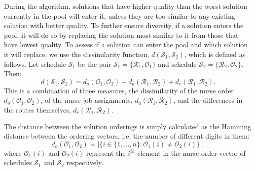 \documentclass[a4paper,11pt,authoryear]{elsarticle}
\begin{document}
During the algorithm, solutions that have higher quality than the worst solution currently in the pool will enter it, unless they are too similar to any existing solution with better quality. To further ensure diversity, if a solution enters the pool, it will do so by replacing the solution most similar to it from those that have lowest quality. To assess if a solution can enter the pool and which solution it will replace, we use the dissimilarity function, $d(\mathcal{S}_1, \mathcal{S}_2)$, which is defined as follows. Let schedule $\mathcal{S}_1$ be the pair $\mathcal{S}_1 = \{\mathcal{R}_1, \mathcal{O}_1\}$ and schedule $\mathcal{S}_2 = \{\mathcal{R}_2, \mathcal{O}_2\}$. Then:
\begin{equation}
    d(\mathcal{S}_1, \mathcal{S}_2) = d_o(\mathcal{O}_1, \mathcal{O}_2) + d_a(\mathcal{R}_1, \mathcal{R}_2) + d_r(\mathcal{R}_1, \mathcal{R}_2).
\end{equation}
This is a combination of three measures, the dissimilarity of the nurse order $d_o(\mathcal{O}_1, \mathcal{O}_2)$, of the nurse-job assignments, $d_a(\mathcal{R}_1, \mathcal{R}_2)$, and the differences in the routes themselves, $d_r(\mathcal{R}_1, \mathcal{R}_2)$.

The distance between the solution orderings is simply calculated as the Hamming distance between the ordering vectors, i.e. the number of different digits in them:
\begin{equation}
    d_o(\mathcal{O}_1, \mathcal{O}_2) = |\{i\in\{1,\dots,n\} : \mathcal{O}_1(i) \neq  \mathcal{O}_2(i)\}|,
\end{equation}
where $\mathcal{O}_1(i)$ and $\mathcal{O}_2(i)$ represent the $i^{th}$ element in the nurse order vector of schedules $\mathcal{S}_1$ and $\mathcal{S}_2$ respectively.
\end{document}
